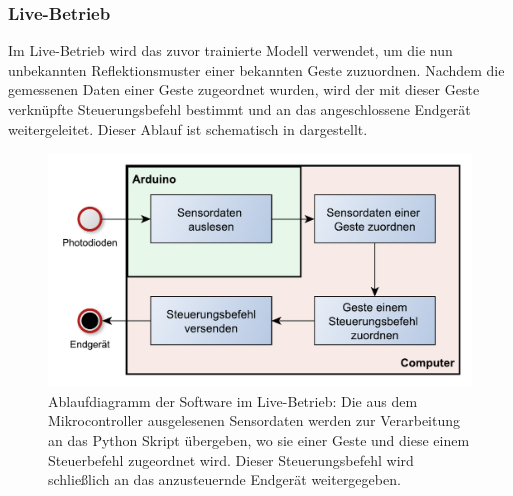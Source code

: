 \subsubsection*{Live-Betrieb}
Im Live-Betrieb wird das zuvor trainierte Modell verwendet, um die nun unbekannten Reflektionsmuster einer bekannten Geste zuzuordnen. Nachdem die gemessenen Daten einer Geste zugeordnet wurden, wird der mit dieser Geste verknüpfte Steuerungsbefehl bestimmt und an das angeschlossene Endgerät weitergeleitet. Dieser Ablauf ist schematisch in  dargestellt.

\begin{figure}[h]
	\centering
	\includegraphics[scale=0.75]{../figures/AblaufSteuerung.pdf}
	\caption{Ablaufdiagramm der Software im Live-Betrieb: Die aus dem Mikrocontroller ausgelesenen Sensordaten werden zur Verarbeitung an das Python Skript übergeben, wo sie einer Geste und diese einem Steuerbefehl zugeordnet wird. Dieser Steuerungsbefehl wird schließlich an das anzusteuernde Endgerät weitergegeben.}
	\label{fig:AblaufSteuerung}
\end{figure}